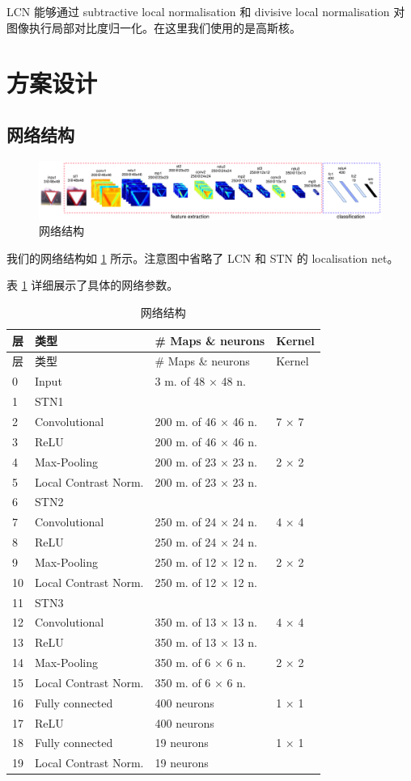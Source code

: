 \documentclass{report}
\begin{document}
LCN 能够通过 subtractive local normalisation 和 divisive local normalisation 对图像执行局部对比度归一化。在这里我们使用的是高斯核。

\section{方案设计}

\subsection{网络结构}

\begin{figure}[htbp]
  \centering
  \includegraphics[width = 1 \textwidth]{STN-CNN.png}
  \caption{网络结构}
  \label{fig:network}
\end{figure}

我们的网络结构如 \ref{fig:network} 所示。注意图中省略了 LCN 和 STN 的 localisation net。

表 \ref{tbl:network} 详细展示了具体的网络参数。

\begin{longtable}[]{@{}llll@{}}
  \caption{\label{tbl:network}网络结构}\tabularnewline
  \toprule
  层 & 类型 & \# Maps \& neurons & Kernel\tabularnewline
  \midrule
  \endfirsthead
  \toprule
  层 & 类型 & \# Maps \& neurons & Kernel\tabularnewline
  \midrule
  \endhead
  0 & Input & 3 m. of 48 × 48 n. &\tabularnewline
  1 & STN1 & &\tabularnewline
  2 & Convolutional & 200 m. of 46 × 46 n. & 7 × 7\tabularnewline
  3 & ReLU & 200 m. of 46 × 46 n. &\tabularnewline
  4 & Max-Pooling & 200 m. of 23 × 23 n. & 2 × 2\tabularnewline
  5 & Local Contrast Norm. & 200 m. of 23 × 23 n. &\tabularnewline
  6 & STN2 & &\tabularnewline
  7 & Convolutional & 250 m. of 24 × 24 n. & 4 × 4\tabularnewline
  8 & ReLU & 250 m. of 24 × 24 n. &\tabularnewline
  9 & Max-Pooling & 250 m. of 12 × 12 n. & 2 × 2\tabularnewline
  10 & Local Contrast Norm. & 250 m. of 12 × 12 n. &\tabularnewline
  11 & STN3 & &\tabularnewline
  12 & Convolutional & 350 m. of 13 × 13 n. & 4 × 4\tabularnewline
  13 & ReLU & 350 m. of 13 × 13 n. &\tabularnewline
  14 & Max-Pooling & 350 m. of 6 × 6 n. & 2 × 2\tabularnewline
  15 & Local Contrast Norm. & 350 m. of 6 × 6 n. &\tabularnewline
  16 & Fully connected & 400 neurons & 1 × 1\tabularnewline
  17 & ReLU & 400 neurons &\tabularnewline
  18 & Fully connected & 19 neurons & 1 × 1\tabularnewline
  19 & Local Contrast Norm. & 19 neurons &\tabularnewline
  \bottomrule
\end{longtable}
\end{document}
